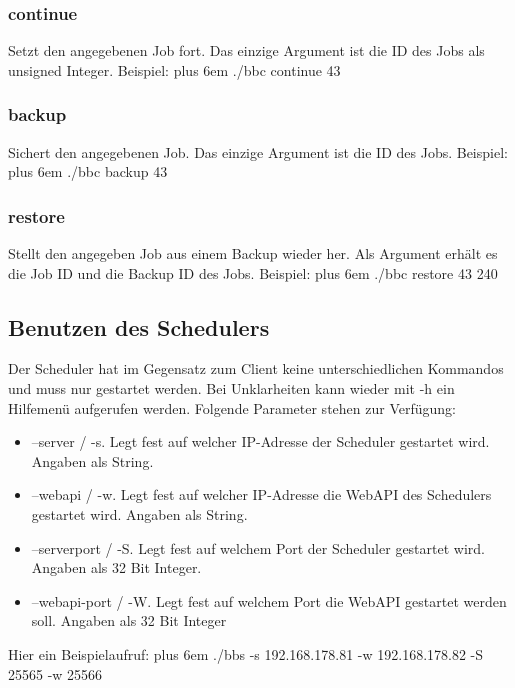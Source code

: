 \documentclass[a4paper,12pt]{article}
\makeatletter
\newenvironment{mycode}
 {\def\@xobeysp{\ }\verbatim\rightskip=0pt plus 6em\relax}
 {\endverbatim}
\makeatother
\begin{document}
\subsubsection{continue}
Setzt den angegebenen Job fort. Das einzige Argument ist die ID des Jobs als unsigned Integer. Beispiel: \newline
\begin{mycode}
	./bbc continue 43
\end{mycode}
\subsubsection{backup}
Sichert den angegebenen Job. Das einzige Argument ist die ID des Jobs. Beispiel:
\newline 
\begin{mycode}
	./bbc backup 43
\end{mycode}
\subsubsection{restore}
Stellt den angegeben Job aus einem Backup wieder her. Als Argument erhält es die Job ID und die Backup ID des Jobs. Beispiel: \newline
\begin{mycode}
	./bbc restore 43 240
\end{mycode}
\subsection{Benutzen des Schedulers}
Der Scheduler hat im Gegensatz zum Client keine unterschiedlichen Kommandos und muss nur gestartet werden. Bei Unklarheiten kann wieder mit -h ein Hilfemenü aufgerufen werden. Folgende Parameter stehen zur Verfügung:
\begin{itemize}
	\item --server / -s. Legt fest auf welcher IP-Adresse der Scheduler gestartet wird. Angaben als String.
	\item --webapi / -w. Legt fest auf welcher IP-Adresse die WebAPI des Schedulers gestartet wird. Angaben als String.
	\item --serverport / -S. Legt fest auf welchem Port der Scheduler gestartet wird. Angaben als 32 Bit Integer.
	\item --webapi-port / -W. Legt fest auf welchem Port die WebAPI gestartet werden soll. Angaben als 32 Bit Integer
\end{itemize}
Hier ein Beispielaufruf:
\begin{mycode}
	./bbs -s 192.168.178.81 -w 192.168.178.82 -S 25565 -w 25566
\end{mycode}
\end{document}
